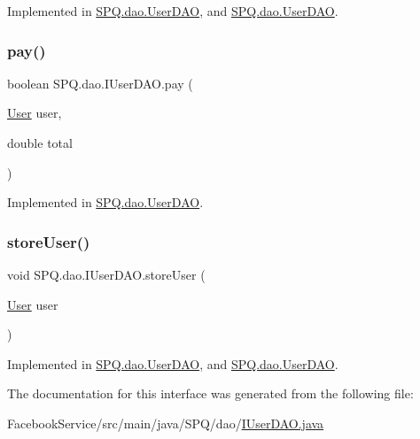 Implemented in \mbox{\hyperlink{class_s_p_q_1_1dao_1_1_user_d_a_o_aeb3901e9e260ad977a1b412fe7a9fc0e}{S\+P\+Q.\+dao.\+User\+D\+AO}}, and \mbox{\hyperlink{class_s_p_q_1_1dao_1_1_user_d_a_o_aeb3901e9e260ad977a1b412fe7a9fc0e}{S\+P\+Q.\+dao.\+User\+D\+AO}}.

\mbox{\label{interface_s_p_q_1_1dao_1_1_i_user_d_a_o_a8a4257a186a80d5842e26aeb1140a402}} 
\subsubsection{\texorpdfstring{pay()}{pay()}}
{\footnotesize\ttfamily boolean S\+P\+Q.\+dao.\+I\+User\+D\+A\+O.\+pay (\begin{DoxyParamCaption}\item[{\mbox{\hyperlink{class_s_p_q_1_1data_1_1_user}{User}}}]{user,  }\item[{double}]{total }\end{DoxyParamCaption})}



Implemented in \mbox{\hyperlink{class_s_p_q_1_1dao_1_1_user_d_a_o_a8223c677b1ae55147860ea533be434a7}{S\+P\+Q.\+dao.\+User\+D\+AO}}.

\mbox{\label{interface_s_p_q_1_1dao_1_1_i_user_d_a_o_a286f084c9e920d1ce196658ab63ab0af}} 
\subsubsection{\texorpdfstring{store\+User()}{storeUser()}}
{\footnotesize\ttfamily void S\+P\+Q.\+dao.\+I\+User\+D\+A\+O.\+store\+User (\begin{DoxyParamCaption}\item[{\mbox{\hyperlink{class_s_p_q_1_1data_1_1_user}{User}}}]{user }\end{DoxyParamCaption})}



Implemented in \mbox{\hyperlink{class_s_p_q_1_1dao_1_1_user_d_a_o_a9cc4105782c52054e71fa4938b55f7aa}{S\+P\+Q.\+dao.\+User\+D\+AO}}, and \mbox{\hyperlink{class_s_p_q_1_1dao_1_1_user_d_a_o_ad86d4148c7f3fd960fb32de7c68f3f6a}{S\+P\+Q.\+dao.\+User\+D\+AO}}.



The documentation for this interface was generated from the following file\+:\begin{DoxyCompactItemize}
\item 
Facebook\+Service/src/main/java/\+S\+P\+Q/dao/\mbox{\hyperlink{_facebook_service_2src_2main_2java_2_s_p_q_2dao_2_i_user_d_a_o_8java}{I\+User\+D\+A\+O.\+java}}\end{DoxyCompactItemize}

